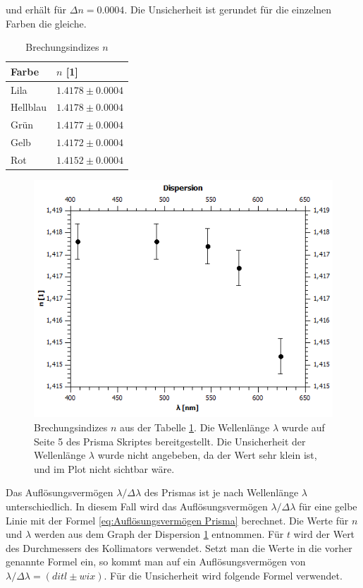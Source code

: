 \documentclass[12pt,a4paper,twoside]{article}
\begin{document}
\noindent
und erhält für $\Delta n = 0.0004$. Die Unsicherheit ist gerundet für die einzelnen Farben die gleiche. 

\begin{table}[H]
    \centering
    \caption{Brechungsindizes $n$}
    \label{tab:delta n}
    \begin{tabular}{| l | l |}
        \hline
        Farbe & $n$ [1] \\
        \hline
        Lila        & $ 1.4178 \pm 0.0004 $ \\
        Hellblau    & $ 1.4178 \pm 0.0004 $ \\
        Grün        & $ 1.4177 \pm 0.0004 $ \\
        Gelb        & $ 1.4172 \pm 0.0004 $ \\
        Rot         & $ 1.4152 \pm 0.0004 $ \\
        \hline
    \end{tabular}
\end{table}

\begin{figure}[H]
    \centering
    \includegraphics[width=0.6\linewidth]{nudes/Dispersion.png}
    \caption{Brechungsindizes $n$ aus der Tabelle \ref{tab:delta n}. Die Wellenlänge $\lambda$ wurde auf Seite 5 des Prisma Skriptes \cite{teachcenter2} bereitgestellt. Die Unsicherheit der Wellenlänge $\lambda$ wurde nicht angebeben, da der Wert sehr klein ist, und im Plot nicht sichtbar wäre.}
    \label{fig:Dispersion Prisma}
\end{figure}

\noindent
Das Auflösungsvermögen $\lambda / \Delta \lambda$ des Prismas ist je nach Wellenlänge $\lambda$ unterschiedlich. 
In diesem Fall wird das Auflösungsvermögen $\lambda / \Delta \lambda$  für eine gelbe Linie mit der Formel \ref{eq:Auflösungsvermögen Prisma} berechnet. 
Die Werte für $n$ und $\lambda$ werden aus dem Graph der Dispersion \ref{fig:Dispersion Prisma} entnommen. 
Für $t$ wird der Wert des Durchmessers des Kollimators verwendet.  
Setzt man die Werte in die vorher genannte Formel ein, so kommt man auf ein Auflösungsvermögen von $\lambda / \Delta \lambda = (ditl \pm wix)$. 
Für die Unsicherheit wird folgende Formel verwendet. 
\end{document}
